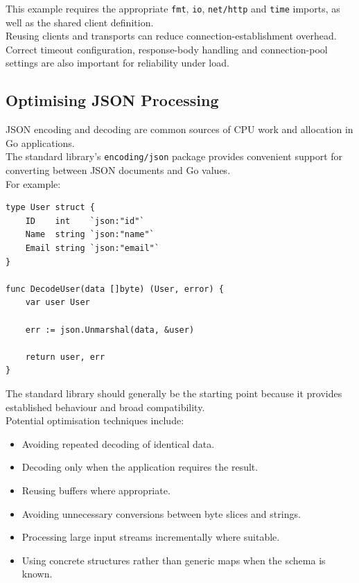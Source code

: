 This example requires the appropriate \texttt{fmt}, \texttt{io}, \texttt{net/http} and \texttt{time} imports, as well as the shared client definition.\\

Reusing clients and transports can reduce connection-establishment overhead. Correct timeout configuration, response-body handling and connection-pool settings are also important for reliability under load.

\subsection{Optimising JSON Processing}

JSON encoding and decoding are common sources of CPU work and allocation in Go applications.\\

The standard library's \texttt{encoding/json} package provides convenient support for converting between JSON documents and Go values.\\

For example:

\begin{lstlisting}
type User struct {
    ID    int    `json:"id"`
    Name  string `json:"name"`
    Email string `json:"email"`
}

func DecodeUser(data []byte) (User, error) {
    var user User

    err := json.Unmarshal(data, &user)

    return user, err
}
\end{lstlisting}

The standard library should generally be the starting point because it provides established behaviour and broad compatibility.\\

Potential optimisation techniques include:

\begin{itemize}
    \item Avoiding repeated decoding of identical data.
    \item Decoding only when the application requires the result.
    \item Reusing buffers where appropriate.
    \item Avoiding unnecessary conversions between byte slices and strings.
    \item Processing large input streams incrementally where suitable.
    \item Using concrete structures rather than generic maps when the schema is known.
\end{itemize}

